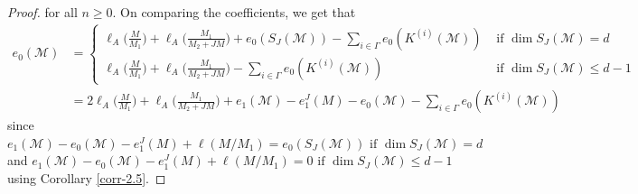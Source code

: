 \documentclass[10pt,a4paper]{amsart}
\def\M{{\mathcal M}}
\begin{document}
\begin{proof}
	for all $n\geq 0$. On comparing the coefficients, we get that
	\begin{align*} 
		e_0(\M)&=\begin{cases}
			\ell_A\Big(\frac{M}{M_1}\Big)+ \ell_A\Big(\frac{M_1}{M_2+JM}\Big)+e_0(S_J(\M))-\mathop\sum\limits_{i\in\Gamma} e_0(K^{(i)}(\M)) & \text{  if } \dim S_J(\M)=d\\        
			\ell_A\Big(\frac{M}{M_1}\Big)+ \ell_A\Big(\frac{M_1}{M_2+JM}\Big)-\mathop\sum\limits_{i\in\Gamma} e_0(K^{(i)}(\M)) & \text{  if } \dim S_J(\M)\leq d-1
		\end{cases}\\
		&= 2\ell_A\Big(\frac{M}{M_1}\Big)+ \ell_A\Big(\frac{M_1}{M_2+JM}\Big)+e_1(\mathcal{M})-e_1^J(M)-e_0(\M)-\mathop\sum\limits_{i\in\Gamma}e_0(K^{(i)}(\M))
	\end{align*}
	since $e_1(\M)-e_0(\M)-e_1^J(M)+\ell(M/M_1)=e_0(S_J(\M))  \text{ if } \dim S_J(\M)=d$ and
	$e_1(\M)-e_0(\M)-e_1^J(M)+\ell(M/M_1)=0  \text{ if } \dim S_J(\M)\leq d-1$
	using Corollary \ref{corr-2.5}. 
\end{proof}
\end{document}
